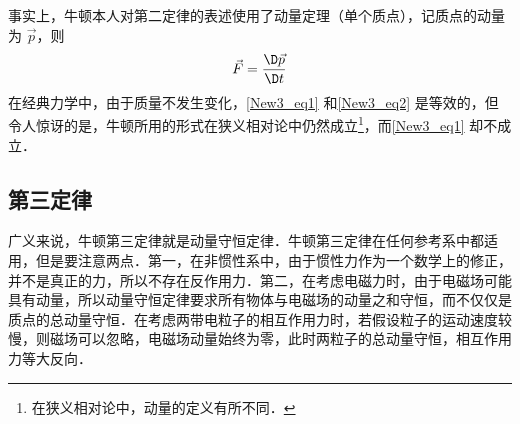 事实上，牛顿本人对第二定律的表述使用了动量定理（单个质点），记质点的动量为 $\vec p$，则
\begin{equation}\label{New3_eq2}
\vec F = \frac{{\D\vec p}}{{\D t}}
\end{equation}
在经典力学中，由于质量不发生变化，\autoref{New3_eq1} 和\autoref{New3_eq2} 是等效的，但令人惊讶的是，牛顿所用的形式在狭义相对论中仍然成立\footnote{在狭义相对论中，动量的定义有所不同．}，而\autoref{New3_eq1} 却不成立．

\subsection{第三定律}
广义来说，牛顿第三定律就是动量守恒定律．牛顿第三定律在任何参考系中都适用，但是要注意两点．第一，在非惯性系中，由于惯性力作为一个数学上的修正，并不是真正的力，所以不存在反作用力．第二，在考虑电磁力时，由于电磁场可能具有动量，所以动量守恒定律要求所有物体与电磁场的动量之和守恒，而不仅仅是质点的总动量守恒．在考虑两带电粒子的相互作用力时，若假设粒子的运动速度较慢，则磁场可以忽略，电磁场动量始终为零，此时两粒子的总动量守恒，相互作用力等大反向．
